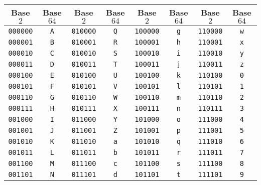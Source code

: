\begin{table}[!htb]
	\begin{center}		
		\begin{tabular}{cc|cc|cc|cc}
			\toprule
			Base $2$ & Base $64$ & Base $2$ & Base $64$ & Base $2$ & Base $64$ & Base $2$ & Base $64$ \\ \midrule
			\texttt{000000} & \texttt{A} & \texttt{010000} & \texttt{Q} & \texttt{100000} & \texttt{g} & \texttt{110000} & \texttt{w} \\
			\texttt{000001} & \texttt{B} & \texttt{010001} & \texttt{R} & \texttt{100001} & \texttt{h} & \texttt{110001} & \texttt{x} \\
			\texttt{000010} & \texttt{C} & \texttt{010010} & \texttt{S} & \texttt{100010} & \texttt{i} & \texttt{110010} & \texttt{y} \\
			\texttt{000011} & \texttt{D} & \texttt{010011} & \texttt{T} & \texttt{100011} & \texttt{j} & \texttt{110011} & \texttt{z} \\
			\texttt{000100} & \texttt{E} & \texttt{010100} & \texttt{U} & \texttt{100100} & \texttt{k} & \texttt{110100} & \texttt{0} \\
			\texttt{000101} & \texttt{F} & \texttt{010101} & \texttt{V} & \texttt{100101} & \texttt{l} & \texttt{110101} & \texttt{1} \\
			\texttt{000110} & \texttt{G} & \texttt{010110} & \texttt{W} & \texttt{100110} & \texttt{m} & \texttt{110110} & \texttt{2} \\
			\texttt{000111} & \texttt{H} & \texttt{010111} & \texttt{X} & \texttt{100111} & \texttt{n} & \texttt{110111} & \texttt{3} \\
			\texttt{001000} & \texttt{I} & \texttt{011000} & \texttt{Y} & \texttt{101000} & \texttt{o} & \texttt{111000} & \texttt{4} \\
			\texttt{001001} & \texttt{J} & \texttt{011001} & \texttt{Z} & \texttt{101001} & \texttt{p} & \texttt{111001} & \texttt{5} \\
			\texttt{001010} & \texttt{K} & \texttt{011010} & \texttt{a} & \texttt{101010} & \texttt{q} & \texttt{111010} & \texttt{6} \\
			\texttt{001011} & \texttt{L} & \texttt{011011} & \texttt{b} & \texttt{101011} & \texttt{r} & \texttt{111011} & \texttt{7} \\
			\texttt{001100} & \texttt{M} & \texttt{011100} & \texttt{c} & \texttt{101100} & \texttt{s} & \texttt{111100} & \texttt{8} \\
			\texttt{001101} & \texttt{N} & \texttt{011101} & \texttt{d} & \texttt{101101} & \texttt{t} & \texttt{111101} & \texttt{9} \\

\end{tabular}
\end{center}
\end{table}
